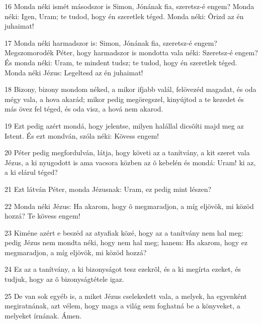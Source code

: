 \par 16 Monda néki ismét másodszor is Simon, Jónának fia, szeretsz-é engem? Monda néki: Igen, Uram; te tudod, hogy én szeretlek téged. Monda néki: Õrizd az én juhaimat!
\par 17 Monda néki harmadszor is: Simon, Jónának fia, szeretsz-é engem? Megszomorodék Péter, hogy harmadszor is mondotta vala néki: Szeretsz-é engem? És monda néki: Uram, te mindent tudsz; te tudod, hogy én szeretlek téged. Monda néki Jézus: Legeltesd az én juhaimat!
\par 18 Bizony, bizony mondom néked, a mikor ifjabb valál, felövezéd magadat, és oda mégy vala, a hova akarád; mikor pedig megöregszel, kinyújtod a te kezedet és más övez fel téged, és oda visz, a hová nem akarod.
\par 19 Ezt pedig azért mondá, hogy jelentse, milyen halállal dicsõíti majd meg az Istent. És ezt mondván, szóla néki: Kövess engem!
\par 20 Péter pedig megfordulván, látja, hogy követi az a tanítvány, a kit szeret vala Jézus, a ki nyugodott is ama vacsora közben az õ kebelén és mondá: Uram! ki az, a ki elárul téged?
\par 21 Ezt látván Péter, monda Jézusnak: Uram, ez pedig mint lészen?
\par 22 Monda néki Jézus: Ha akarom, hogy õ megmaradjon, a míg eljövök, mi közöd hozzá? Te kövess engem!
\par 23 Kiméne azért e beszéd az atyafiak közé, hogy az a tanítvány nem hal meg: pedig Jézus nem mondta néki, hogy nem hal meg; hanem: Ha akarom, hogy ez megmaradjon, a míg eljövök, mi közöd hozzá?
\par 24 Ez az a tanítvány, a ki bizonyságot tesz ezekrõl, és a ki megírta ezeket, és tudjuk, hogy az õ bizonyságtétele igaz.
\par 25 De van sok egyéb is, a miket Jézus cselekedett vala, a melyek, ha egyenként megiratnának, azt vélem, hogy maga a világ sem foghatná be a könyveket, a melyeket írnának. Ámen.


